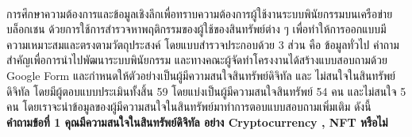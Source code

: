 \documentclass[12pt,oneside,openright,a4paper]{cpe-thai-project}
\begin{document}


\makeatletter
\g@addto@macro{\UrlBreaks}{\UrlOrds}
\makeatother



 \\
\tab การศึกษาความต้องการและข้อมูลเชิงลึกเพื่อทราบความต้องการผู้ใช้งานระบบพินัยกรรมบนเครือข่ายบล็อกเชน  ด้วยการใช้การสำรวจหาพฤติกรรมของผู้ใช้ของสินทรัพย์ต่าง ๆ เพื่อทำให้การออกแบบมีความเหมาะสมและตรงตามวัตถุประสงค์ โดยแบบสำรวจประกอบด้วย 3 ส่วน คือ ข้อมูลทั่วไป คำถามสำคัญเพื่อการนำไปพัฒนาระบบพินัยกรรม และทางคณะผู้จัดทำโครงงานได้สร้างแบบสอบถามด้วย Google Form และกำหนดให้ตัวอย่างเป็นผู้มีความสนใจสินทรัพย์ดิจิทัล และ ไม่สนใจในสินทรัพย์ดิจิทัล โดยมีผู้ตอบแบบประเมินทั้งสิ้น 59 โดยแบ่งเป็นผู้มีความสนใจสินทรัพย์ 54 คน และไม่สนใจ 5 คน โดยเราจะนำข้อมูลของผู้มีความสนใจในสินทรัพย์มาทำการตอบแบบสอบถามเพิ่มเติม ดังนี้\\

\bf คำถามข้อที่ 1 คุณมีความสนใจในสินทรัพย์ดิจิทัล อย่าง Cryptocurrency , NFT หรือไม่\\
\end{document}
